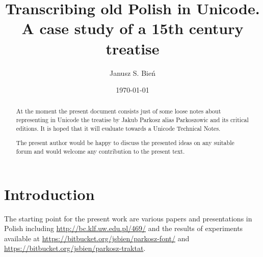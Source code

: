 \documentclass{mwart}
\begin{document}
% 
\title{Transcribing old Polish in Unicode.\\ A case study of a 15th century treatise}

\author{Janusz S. Bień}


\date{\today}

\maketitle

\begin{abstract}

  At the moment the present document consists just of some loose notes
  about representing in Unicode the treatise by Jakub Parkosz alias
  Parkoszowic and its critical editions. It is hoped that it will
  evaluate towards a Unicode Technical Notes.

  The present author would be happy to discuss the presented ideas on
  any suitable forum and would welcome any contribution to the present
  text.
\end{abstract}

\section{Introduction}
\label{sec:introduction}

The starting point for the present work are various papers and
presentations in Polish including \url{http://bc.klf.uw.edu.pl/469/}
and the results of experiments available at
\url{https://bitbucket.org/jsbien/parkosz-font/} and
\url{https://bitbucket.org/jsbien/parkosz-traktat}.



\end{document}
